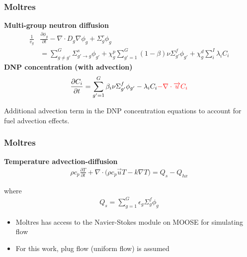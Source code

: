 \begin{frame}
	\frametitle{Moltres}
	\textbf{Multi-group neutron diffusion}
		\begin{align}
	\frac{1}{v_g} &\frac{\partial \phi_g}{\partial t} - \nabla \cdot D_g \nabla
	\phi_g + \Sigma^r_g \phi_g \nonumber \\ 
	&= \sum^G_{g \neq g'} \Sigma^s_{g' \rightarrow g} \phi_{g'} + \chi^p_g
	\sum^G_{g'=1} (1-\beta) \nu \Sigma^f_{g'} \phi_{g'} + \chi^d_g \sum^I_i
	\lambda_i C_i \label{eq1}
		\end{align}
	\textbf{\gls{DNP} concentration (with advection)}
		\begin{align}
	\frac{\partial C_i}{\partial t} = \sum^G_{g'=1} \beta_i \nu \Sigma^f_{g'}
	\phi_{g'} - \lambda_i C_i
	{\color{red}
	 - \nabla \cdot \overrightarrow{u} C_i}
	\label{eq2}
		\end{align}
		
		Additional advection term in the \gls{DNP} concentration
		equations to account for fuel advection effects.
\end{frame}

\begin{frame}
	\frametitle{Moltres}
		\textbf{Temperature advection-diffusion}
		\begin{align}
	\rho c_{p} \frac{\partial T}{\partial t} + \nabla \cdot \big( \rho
	c_{p} \overrightarrow{u} T - k \nabla T \big) = Q_s - Q_{hx}
	\label{eq3}
		\end{align}
		
		where
		\begin{align*}
		Q_s = \sum^G_{g=1} \epsilon_g \Sigma_g^f \phi_g \label{eq4}
		\end{align*}
		
		\begin{itemize}
			\item Moltres has access to the Navier-Stokes module on \gls{MOOSE}
			for simulating flow
			\item For this work, plug flow (uniform flow) is assumed
		\end{itemize}
\end{frame}


